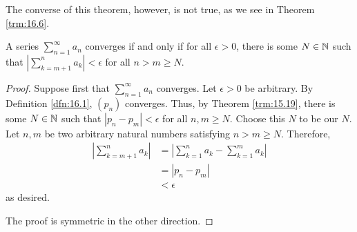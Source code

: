 \documentclass[../main.tex]{subfiles}
\begin{document}
The converse of this theorem, however, is not true, as we see in Theorem \ref{trm:16.6}.

\begin{theorem}\label{trm:16.5}
    A series $\sum_{n=1}^\infty a_n$ converges if and only if for all $\epsilon>0$, there is some $N\in\mathbb{N}$ such that $|\sum_{k=m+1}^na_k|<\epsilon$ for all $n>m\geq N$.
    \begin{proof}
        Suppose first that $\sum_{n=1}^\infty a_n$ converges. Let $\epsilon>0$ be arbitrary. By Definition \ref{dfn:16.1}, $(p_n)$ converges. Thus, by Theorem \ref{trm:15.19}, there is some $N\in\mathbb{N}$ such that $|p_n-p_m|<\epsilon$ for all $n,m\geq N$. Choose this $N$ to be our $N$. Let $n,m$ be two arbitrary natural numbers satisfying $n>m\geq N$. Therefore,
        \begin{align*}
            \left| \sum_{k=m+1}^na_k \right| &= \left| \sum_{k=1}^na_k-\sum_{k=1}^ma_k \right|\\
            &= |p_n-p_m|\\
            &< \epsilon
        \end{align*}
        as desired.\par
        The proof is symmetric in the other direction.
    \end{proof}
\end{theorem}
\end{document}
